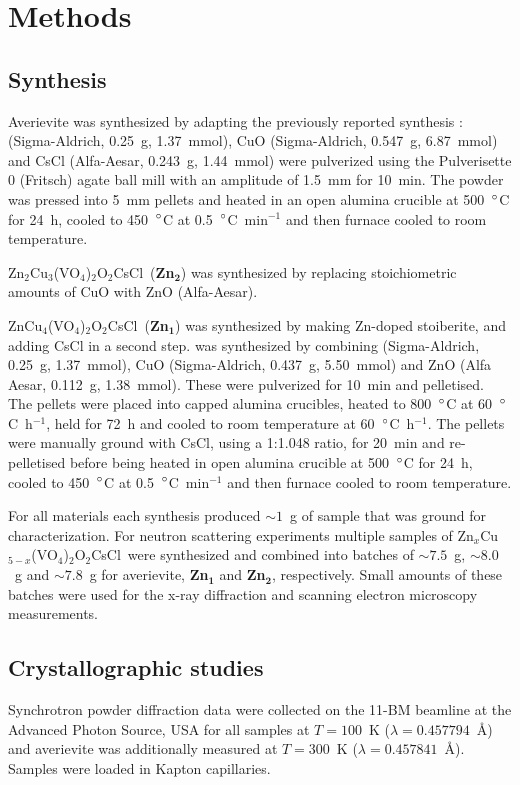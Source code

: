 \documentclass[
sn-nature,
Numbered,
iicol]
{sn-jnl}%
\newcommand{\znave}{ZnCu$_4$(VO$_4$)$_{2}$O$_2$CsCl}
\newcommand{\zntwoave}{Zn$_2$Cu$_3$(VO$_4$)$_{2}$O$_2$CsCl}
\newcommand{\aveser}{Zn$_x$Cu$_{5-x}$(VO$_4$)$_{2}$O$_2$CsCl}
\begin{document}
\backmatter

\section{Methods}
\label{SecExp}

\subsection*{Synthesis}
\label{SecSynthesis}
 Averievite was synthesized by adapting the previously reported synthesis \cite{Botana2018}:  (Sigma-Aldrich, 0.25~g, 1.37~mmol), CuO (Sigma-Aldrich, 0.547~g, 6.87~mmol) and CsCl (Alfa-Aesar, 0.243~g, 1.44~mmol) were pulverized using the Pulverisette 0 (Fritsch) agate ball mill with an amplitude of 1.5~mm for 10~min. The powder was pressed into 5~mm pellets and heated in an open alumina crucible at 500~$\degree$C for 24~h, cooled to 450~$\degree$C at 0.5~$\degree$C~min$^{-1}$ and then furnace cooled to room temperature.
 
\zntwoave\ ({\bf Zn$\mathbf {_2}$}) was synthesized by replacing stoichiometric amounts of CuO with ZnO (Alfa-Aesar). 

\znave\ ({\bf Zn$\mathbf {_1}$}) was synthesized by making Zn-doped stoiberite,  \cite{Hillel2013} and adding CsCl in a second step.  was synthesized by combining  (Sigma-Aldrich, 0.25~g, 1.37~mmol), CuO (Sigma-Aldrich, 0.437~g, 5.50~mmol) and ZnO (Alfa Aesar, 0.112~g, 1.38~mmol). These were pulverized for 10~min and pelletised. The pellets were placed into capped alumina crucibles, heated to 800~$\degree$C at 60~$\degree$C~h$^{-1}$, held for 72~h and cooled to room temperature at 60~$\degree$C~h$^{-1}$. The pellets were manually ground with CsCl, using a 1:1.048 ratio, for 20~min and re-pelletised before being heated in open alumina crucible at 500~$\degree$C for 24~h, cooled to 450~$\degree$C at 0.5~$\degree$C~min$^{-1}$ and then furnace cooled to room temperature.

For all materials each synthesis produced $\sim 1$~g of sample that was ground for characterization. 
For neutron scattering experiments multiple samples of \aveser\ were synthesized and combined into batches of $\sim7.5$~g, $\sim8.0$~g and $\sim7.8$~g for averievite, {\bf Zn$\mathbf {_1}$} and {\bf Zn$\mathbf {_2}$}, respectively. 
Small amounts of these batches were used for the x-ray diffraction and scanning electron microscopy measurements. 


\subsection*{Crystallographic studies}
\label{SecStructure}
Synchrotron powder diffraction data were collected on the 11-BM beamline at the Advanced Photon Source, USA for all samples at $T=100$~K ($\lambda=0.457794$~\AA) and averievite was additionally measured at $T=300$~K  ($\lambda=0.457841$~\AA). 
Samples were loaded in Kapton capillaries. 
\end{document}
